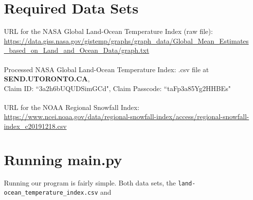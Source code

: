 \documentclass[fontsize=11pt]{article}
\begin{document}
\section*{Required Data Sets}

URL for the NASA Global Land-Ocean Temperature Index (raw file): \url{https://data.giss.nasa.gov/gistemp/graphs/graph_data/Global_Mean_Estimates_based_on_Land_and_Ocean_Data/graph.txt}\\
\\
Processed NASA Global Land-Ocean Temperature Index: .csv file at \textbf{ SEND.UTORONTO.CA}, \\Claim ID: ``3a2h6bUQUDSimGCd", Claim Passcode: ``taFp3a85Yg2HHBEs"\\
\\
URL for the NOAA Regional Snowfall Index: 
\url{https://www.ncei.noaa.gov/data/regional-snowfall-index/access/regional-snowfall-index_c20191218.csv}

\section*{Running main.py}
Running our program is fairly simple. Both data sets, the \texttt{land-ocean\_temperature\_index.csv} and 
\end{document}
